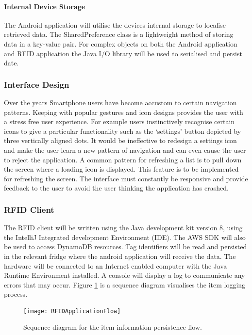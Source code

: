 \documentclass[a4paper, 11pt]{article}
\begin{document}
\paragraph{Internal Device Storage}The Android application will utilise the devices internal storage to localise retrieved data. The SharedPreference class is a lightweight method of storing data in a key-value pair. For complex objects on both the Android application and RFID application the Java I/O library will be used to serialised and persist date.  

\subsubsection {Interface Design}
Over the years Smartphone users have become accustom to certain navigation patterns. Keeping with popular gestures and icon designs provides the user with a stress free user experience. For example users instinctively recognise certain icons to give a particular functionality such as the `settings' button depicted by three vertically aligned dots. It would be ineffective to redesign a settings icon and make the user learn a new pattern of navigation and can even cause the user to reject the application. A common pattern for refreshing a list is to pull down the screen where a loading icon is displayed. This feature is to be implemented for refreshing the screen. The interface must constantly be responsive and provide feedback to the user to avoid the user thinking the application has crashed. 

\subsubsection {RFID Client}
The RFID client will be written using the Java development kit version 8, using the IntelliJ Integrated development Environment (IDE). The AWS SDK will also be used to access DynamoDB resources. Tag identifiers will be read and persisted in the relevant fridge where the android application will receive the data. The hardware will be connected to an Internet enabled computer with the Java Runtime Environment installed. A console will display a log to communicate any errors that may occur. Figure \ref{fig:RFIDApplicationFlow} is a sequence diagram visualises the item logging process.

\begin{figure}[!htbp]
\centering
\texttt{[image: RFIDApplicationFlow]}
\caption{Sequence diagram for the item information persistence flow.} \label{fig:RFIDApplicationFlow}
\end{figure}
\end{document}
